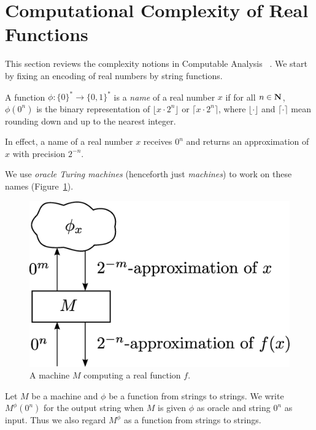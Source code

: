 \section{Computational Complexity of Real Functions}
\label{section: preliminaries}

This section reviews the complexity notions 
in Computable Analysis~%
\cite{ko1991complexity,weihrauch00:_comput_analy}. 
We start by fixing an encoding of real numbers 
by string functions.

\begin{definition}
 A function $\phi \colon \{0\} ^* \to \{0, 1\}^*$ is a \emph{name} of a real number $x$ 
 if for all $n \in \mathbf N$,
  $\phi(0^n)$ is the binary representation of $\lfloor x \cdot 2^n \rfloor$ or
  $\lceil x \cdot 2^n \rceil$,
 where $\lfloor \cdot \rfloor$ and $\lceil \cdot \rceil$ mean
 rounding down and up to the nearest integer.
 \end{definition}

In effect, a name of a real number $x$ receives $0 ^n$ and 
returns an approximation of $x$ with precision $2 ^{-n}$.

We use \emph{oracle Turing machines} (henceforth just \emph{machines})
to work on these names (Figure~\ref{fig:model-of-function}).
 \begin{figure}[tb]
  \begin{center}
   \includegraphics[height=0.15\textheight]{image/model-of-function.eps}
  \end{center}
  \caption{A machine $M$ computing a real function $f$.}
  \label{fig:model-of-function}
 \end{figure}
Let $M$ be a machine and $\phi$ be a function from strings to strings. 
We write $M ^\phi (0 ^n)$ for the output string 
when $M$ is given
$\phi$ as oracle and string $0^n$ as input.
Thus we also regard $M^\phi$ as a function from strings to strings.

